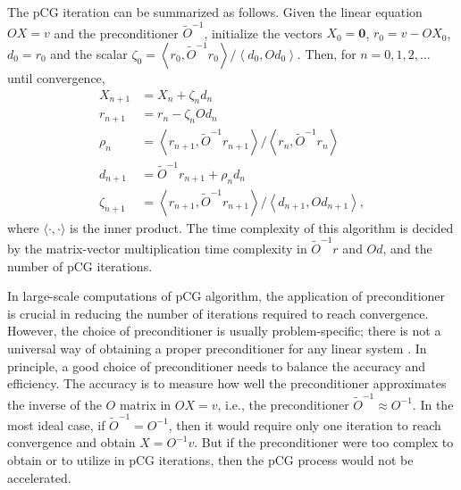 \documentclass[aps,prl,twocolumn,superscriptaddress,showpacs,longbibliography]{revtex4-2}
\newcommand{\nn}{\nonumber}
\begin{document}
The pCG iteration can be summarized as follows. Given the linear equation $O X= v$ and the preconditioner $\tilde{O}^{-1}$, initialize the vectors $X_0 = \mathbf{0}$, $r_0 = v - O X_0$, $d_0=r_0$ and the scalar $\zeta_0 = \left\langle r_{0}, \tilde{O}^{-1} r_{0}\right\rangle /\left\langle d_{0}, O d_{0}\right\rangle$. Then, for $n=0,1,2,\ldots$ until convergence,
\begin{align}
 X_{n+1} & =X_n+\zeta_n d_n \nn \\
 r_{n+1} & =r_n-\zeta_n O d_n \nn \\
 \rho_n & =\left\langle r_{n+1}, \tilde{O}^{-1} r_{n+1}\right\rangle /\left\langle r_n, \tilde{O}^{-1} r_n\right\rangle \label{eq:pCG} \\
 d_{n+1} & =\tilde{O}^{-1} r_{n+1}+\rho_n d_n \nn \\
 \zeta_{n+1} & =\left\langle r_{n+1}, \tilde{O}^{-1} r_{n+1}\right\rangle /\left\langle d_{n+1}, O d_{n+1}\right\rangle, \nn
\end{align}
where $\langle \cdot, \cdot \rangle$ is the inner product. The time complexity of this algorithm is decided by the matrix-vector multiplication time complexity in $\tilde{O}^{-1} r$ and $O d$, and the number of pCG iterations.

In large-scale computations of pCG algorithm, the application of preconditioner is crucial in reducing the number of iterations required to reach convergence. However, the choice of preconditioner is usually problem-specific; there is not a universal way of obtaining a proper preconditioner for any linear system \cite{Beyl2018}. In principle, a good choice of preconditioner needs to balance the accuracy and efficiency. The accuracy is to measure how well the preconditioner approximates the inverse of the $O$ matrix in $O X = v$, i.e., the preconditioner $\tilde{O}^{-1} \approx O^{-1}$. In the most ideal case, if $\tilde{O}^{-1} = O^{-1}$, then it would require only one iteration to reach convergence and obtain $X = O^{-1}v$. But if the preconditioner were too complex to obtain or to utilize in pCG iterations, then the pCG process would not be accelerated.
\end{document}
